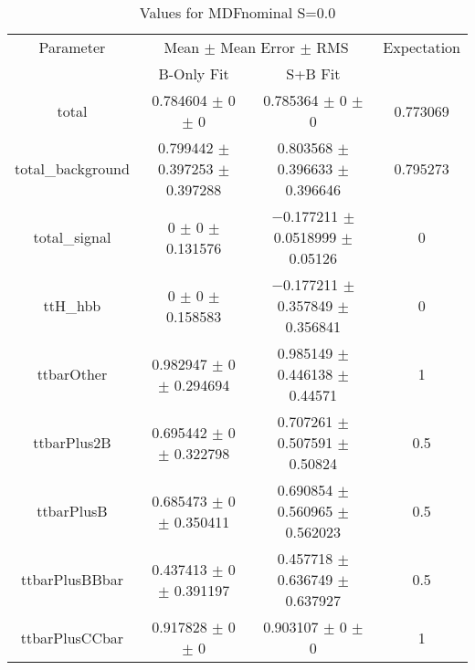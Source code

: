 \begin{table}
\centering
\caption{Values for MDFnominal S=0.0}
\begin{tabular}{cccc}
\toprule
Parameter & \multicolumn{2}{c}{Mean $\pm$ Mean Error $\pm$ RMS} & Expectation\\
 & B-Only Fit & S+B Fit & \\
\midrule
total & \num{0.784604} $\pm$ \num{0} $\pm$ \num{0} & \num{0.785364} $\pm$ \num{0} $\pm$ \num{0} & \num{0.773069}\\
total\_background & \num{0.799442} $\pm$ \num{0.397253} $\pm$ \num{0.397288} & \num{0.803568} $\pm$ \num{0.396633} $\pm$ \num{0.396646} & \num{0.795273}\\
total\_signal & \num{0} $\pm$ \num{0} $\pm$ \num{0.131576} & \num{-0.177211} $\pm$ \num{0.0518999} $\pm$ \num{0.05126} & \num{0}\\
ttH\_hbb & \num{0} $\pm$ \num{0} $\pm$ \num{0.158583} & \num{-0.177211} $\pm$ \num{0.357849} $\pm$ \num{0.356841} & \num{0}\\
ttbarOther & \num{0.982947} $\pm$ \num{0} $\pm$ \num{0.294694} & \num{0.985149} $\pm$ \num{0.446138} $\pm$ \num{0.44571} & \num{1}\\
ttbarPlus2B & \num{0.695442} $\pm$ \num{0} $\pm$ \num{0.322798} & \num{0.707261} $\pm$ \num{0.507591} $\pm$ \num{0.50824} & \num{0.5}\\
ttbarPlusB & \num{0.685473} $\pm$ \num{0} $\pm$ \num{0.350411} & \num{0.690854} $\pm$ \num{0.560965} $\pm$ \num{0.562023} & \num{0.5}\\
ttbarPlusBBbar & \num{0.437413} $\pm$ \num{0} $\pm$ \num{0.391197} & \num{0.457718} $\pm$ \num{0.636749} $\pm$ \num{0.637927} & \num{0.5}\\
ttbarPlusCCbar & \num{0.917828} $\pm$ \num{0} $\pm$ \num{0} & \num{0.903107} $\pm$ \num{0} $\pm$ \num{0} & \num{1}\\
\bottomrule
\end{tabular}
\end{table}
